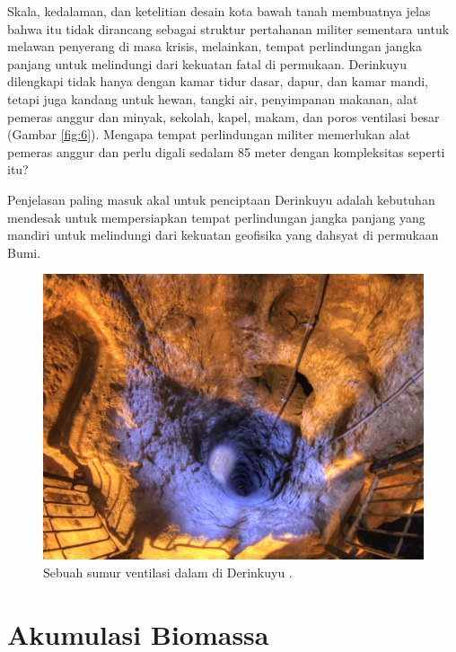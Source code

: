\documentclass[10pt,twocolumn,letterpaper]{article}
\begin{document}
Skala, kedalaman, dan ketelitian desain kota bawah tanah membuatnya jelas bahwa itu tidak dirancang sebagai struktur pertahanan militer sementara untuk melawan penyerang di masa krisis, melainkan, tempat perlindungan jangka panjang untuk melindungi dari kekuatan fatal di permukaan. Derinkuyu dilengkapi tidak hanya dengan kamar tidur dasar, dapur, dan kamar mandi, tetapi juga kandang untuk hewan, tangki air, penyimpanan makanan, alat pemeras anggur dan minyak, sekolah, kapel, makam, dan poros ventilasi besar (Gambar \ref{fig:6}). Mengapa tempat perlindungan militer memerlukan alat pemeras anggur dan perlu digali sedalam 85 meter dengan kompleksitas seperti itu?

Penjelasan paling masuk akal untuk penciptaan Derinkuyu adalah kebutuhan mendesak untuk mempersiapkan tempat perlindungan jangka panjang yang mandiri untuk melindungi dari kekuatan geofisika yang dahsyat di permukaan Bumi.

\begin{figure}[t]
\begin{center}
   \includegraphics[width=1\linewidth]{derinkuyu-air.jpg}
\end{center}
   \caption{Sebuah sumur ventilasi dalam di Derinkuyu \cite{53}.}
\label{fig:6}
\label{fig:onecol}
\end{figure}

\section{Akumulasi Biomassa}
\end{document}
